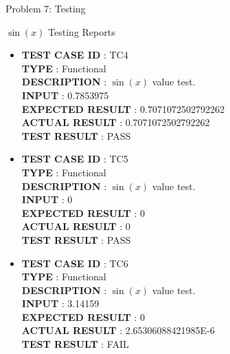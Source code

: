 \documentclass[a4paper,12pt]{article}
\begin{document}
\begin{section}{Problem 7: Testing}
\begin{subsubsection}{$\sin(x)$ Testing Reports}
\begin{itemize}	
\item \textbf{TEST CASE ID} \hspace{1.25cm} : TC4  \\
\textbf{TYPE } \hspace{3.15cm}  : Functional\\
\textbf{DESCRIPTION }\hspace{1.25cm} : $\sin(x)$ value test. \\
\textbf{INPUT} \hspace{3.05cm} :  0.7853975 \\
\textbf{EXPECTED RESULT} \hspace{0.01cm} : 0.7071072502792262 \\
\textbf{ACTUAL RESULT} \hspace{0.6cm} : 0.7071072502792262 \\
\textbf{TEST RESULT} \hspace{1.40cm} : PASS \\

\item \textbf{TEST CASE ID} \hspace{1.25cm} : TC5  \\
\textbf{TYPE } \hspace{3.15cm}  : Functional\\
\textbf{DESCRIPTION }\hspace{1.25cm} : $\sin(x)$ value test. \\
\textbf{INPUT} \hspace{3.05cm} :  0 \\
\textbf{EXPECTED RESULT} \hspace{0.01cm} : 0 \\
\textbf{ACTUAL RESULT} \hspace{0.6cm} : 0 \\
\textbf{TEST RESULT} \hspace{1.40cm} : PASS \\	

\item \textbf{TEST CASE ID} \hspace{1.25cm} : TC6  \\
\textbf{TYPE } \hspace{3.15cm}  : Functional\\
\textbf{DESCRIPTION }\hspace{1.25cm} : $\sin(x)$ value test. \\
\textbf{INPUT} \hspace{3.05cm} :  3.14159 \\
\textbf{EXPECTED RESULT} \hspace{0.01cm} : 0 \\
\textbf{ACTUAL RESULT} \hspace{0.6cm} : 2.65306088421985E-6 \\
\textbf{TEST RESULT} \hspace{1.40cm} : FAIL \\



\end{itemize}
\end{subsubsection}
\end{section}
\end{document}
